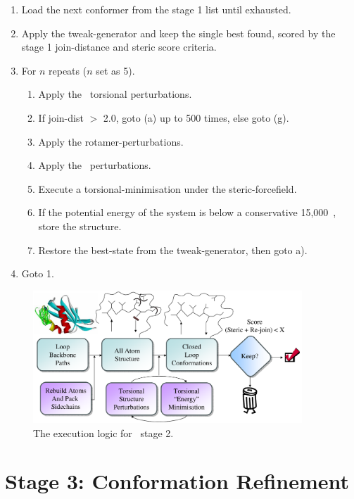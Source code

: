 \begin{enumerate} \isep
\item Load the next conformer from the stage 1 list until exhausted.
\item Apply the tweak-generator and keep the single best
found, scored by the stage 1 join-distance and steric score criteria.
\item For $n$ repeats ($n$ set as 5).
        \begin{enumerate} \isep
        \item Apply the \mainchain\ torsional perturbations.
        \item If join-dist $>$ 2.0, goto (a) up to 500 times, else goto (g).
        \item Apply the rotamer-perturbations.  
        \item Apply the \sidechain\ perturbations.
        \item Execute a torsional-minimisation under the steric-forcefield.
        \item If the potential energy of the system is below a conservative \mbox{15,000 \kcalmol}, store the structure.
        \item Restore the best-state from the tweak-generator, then goto a).
        \end{enumerate}
   \item Goto 1.
\end{enumerate}

\begin{figure}[htbp]
\begin{center}
\includegraphics[width=0.9\textwidth]{./06-PreArcus/stage-2/stage-2.pdf}
\end{center}
\caption{The execution logic for \prearcus\ stage 2.}
\label{fig:prearcus:stage_2}
\end{figure} 

\section{Stage 3: Conformation Refinement }

